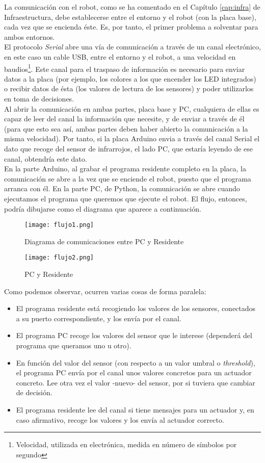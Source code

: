 La comunicación con el robot, como se ha comentado en el Capítulo \ref{cap:infra} de Infraestructura, debe establecerse entre el entorno y el robot (con la placa base), cada vez que se encienda éste. Es, por tanto, el primer problema a solventar para ambos entornos. \\ 
El protocolo \textit{Serial} abre una vía de comunicación a través de un canal electrónico, en este caso un cable USB, entre el entorno y el robot, a una velocidad en baudios\footnote{Velocidad, utilizada en electrónica, medida en número de símbolos por segundo}. Este canal para el traspaso de información es necesario para enviar datos a la placa (por ejemplo, los colores a los que encender los LED integrados) o recibir datos de ésta (los valores de lectura de los sensores) y poder utilizarlos en toma de decisiones. \\
Al abrir la comunicación en ambas partes, placa base y PC, cualquiera de ellas es capaz de leer del canal la información que necesite, y de enviar a través de él (para que esto sea así, ambas partes deben haber abierto la comunicación a la misma velocidad). Por tanto, si la placa Arduino envia a través del canal Serial el dato que recoge del sensor de infrarrojos, el lado PC, que estaría leyendo de ese canal, obtendría este dato. \\
En la parte Arduino, al grabar el programa residente completo en la placa, la comunicación se abre a la vez que se enciende el robot, puesto que el programa arranca con él. En la parte PC, de Python, la comunicación se abre cuando ejecutamos el programa que queremos que ejecute el robot. El flujo, entonces, podría dibujarse como el diagrama que aparece a continuación.
\begin{figure}[h]
	\texttt{[image: flujo1.png]}
	\centering
	\label{img:FlujoComunicaciones}
	\caption{Diagrama de comunicaciones entre PC y Residente}
\end{figure}

\begin{figure}[h]
	\texttt{[image: flujo2.png]}
	\centering
	\label{img:FlujoComunicaciones2}
	\caption{PC y Residente}
\end{figure}

Como podemos observar, ocurren varias cosas de forma paralela:
\begin{itemize}
	\item El programa residente está recogiendo los valores de los sensores, conectados a su puerto correspondiente, y los envía por el canal.
	\item El programa PC recoge los valores del sensor que le interese (dependerá del programa que queramos uno u otro).
	\item En función del valor del sensor (con respecto a un valor umbral o \textit{threshold}), el programa PC envía por el canal unos valores concretos para un actuador concreto. Lee otra vez el valor -nuevo- del sensor, por si tuviera que cambiar de decisión.
	\item El programa residente lee del canal si tiene mensajes para un actuador y, en caso afirmativo, recoge los valores y los envía al actuador correcto.
\end{itemize}

